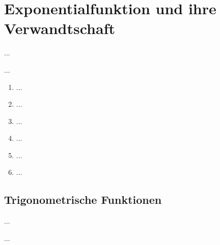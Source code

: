 \documentclass[12pt]{scrreprt}
\begin{document}
\begin{bsp}\label{}

\end{bsp}

\section{Exponentialfunktion und ihre Verwandtschaft}
\label{}
...

\begin{dfn}\label{}

\end{dfn}

\begin{dfn}\label{}

\end{dfn}

\begin{bem}\label{}
...
\begin{enumerate}
\item ...
\item ...
\item ...
\item ...
\item ...
\item ...
\end{enumerate}
\end{bem}

\subsection*{Trigonometrische Funktionen}
...

\begin{satz}\label{}

\end{satz}

\begin{dfn*}

\end{dfn*}

...

\begin{dfn}\label{}

\end{dfn}

\begin{dfn}\label{}

\end{dfn}

\begin{bsp}\label{}

\end{bsp}
\end{document}
